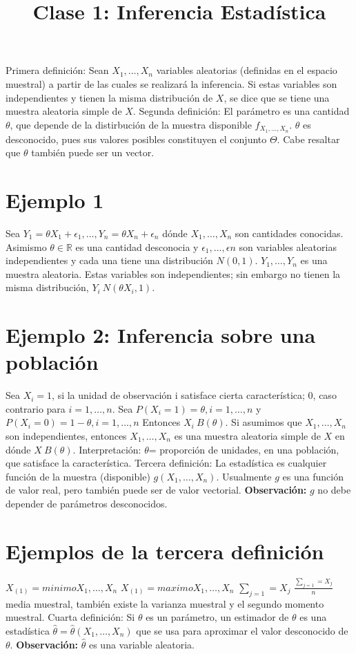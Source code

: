 \documentclass{article}
\title{Clase 1: Inferencia Estadística}
\begin{document}
Primera definición: Sean $X_{1},\ldots,X_{n}$ variables aleatorias (definidas en el espacio muestral) a partir de las cuales se realizará la inferencia. Si estas variables son independientes y tienen la misma distribución de $X$, se dice que se tiene una muestra aleatoria simple de $X$.
Segunda definición: El parámetro es una cantidad $\theta$, que depende de la distirbución de la muestra disponible $f_{X_{1},\ldots,X_{n}}$. $\theta$ es desconocido, pues sus valores posibles constituyen el conjunto $\Theta$. Cabe resaltar que $\theta$ también puede ser un vector.
\section{Ejemplo 1}
Sea $Y_{1}=\theta X_{1} + \epsilon_{1}, \ldots, Y_{n}=\theta X_{n} + \epsilon_{n}$ dónde $X_{1},\ldots,X_{n}$ son cantidades conocidas. Asimismo $\theta \in \mathbb{R}$ es una cantidad desconocia y $\epsilon_{1},\ldots,\epsilon{n}$ son variables aleatorias independientes y cada una tiene una distribución $N(0,1)$. $Y_{1}, \ldots, Y_{n}$ es una muestra aleatoria. Estas variables son independientes; sin embargo no tienen la misma distribución, $Y_{i}~N(\theta X_{i},1)$.
\section{Ejemplo 2: Inferencia sobre una población}
Sea $X_{i}=1$, si la unidad de observación i satisface cierta característica; 0, caso contrario para $i=1,\ldots,n$. Sea $P(X_{i}=1)=\theta, i=1,\ldots,n$ y $P(X_{i}=0)=1-\theta, i=1,\ldots,n$ Entonces $X_{i}~B(\theta)$.
Si asumimos que $X_{1},\ldots,X_{n}$ son independientes, entonces $X_{1},\ldots,X_{n}$ es una muestra aleatoria simple de $X$ en dónde $X~B(\theta)$. Interpretación: $\theta$= proporción de unidades, en una población, que satisface la característica.
Tercera definición: La estadística es cualquier función de la muestra (disponible) $g(X_{1},\ldots,X_{n})$. Usualmente $g$ es una función de valor real, pero también puede ser de valor vectorial. \textbf{Observación:} $g$ no debe depender de parámetros desconocidos.
\section{Ejemplos de la tercera definición}
$X_{(1)}=minimo{X_{1}, \ldots, X_{n}}$
$X_{(1)}=maximo{X_{1}, \ldots, X_{n}} $
$\sum_{j=1}=X_{j}$
$\frac{\sum_{j=1}=X_{j}}{n}$ media muestral, también existe la varianza muestral y el segundo momento muestral.
Cuarta definición: Si $\theta$ es un parámetro, un estimador de $\theta$ es una estadística $\hat{\theta}= \hat{\theta}(X_{1},\ldots,X_{n})$ que se usa para aproximar el valor desconocido de $\theta$. \textbf{Observación:} $\hat{\theta}$ es una variable aleatoria.
\end{document}
